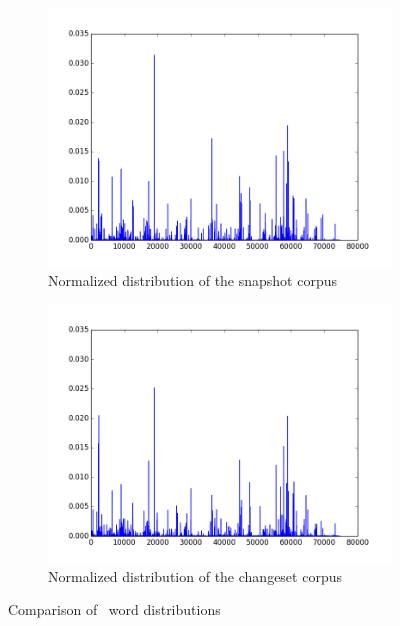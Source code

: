 %
%

\begin{figure}[ht]
\centering
\begin{subfigure}[b]{0.4\textwidth}
    \includegraphics[width=\textwidth]{dist1}
    \caption{Normalized distribution of the snapshot corpus}
    \label{fig:antdist1}
\end{subfigure}
\begin{subfigure}[b]{0.4\textwidth}
    \includegraphics[width=\textwidth]{dist2}
    \caption{Normalized distribution of the changeset corpus}
    \label{fig:antdist2}
\end{subfigure}
\caption{Comparison of \ant\ word distributions}
\vspace*{-12pt}
\end{figure}


